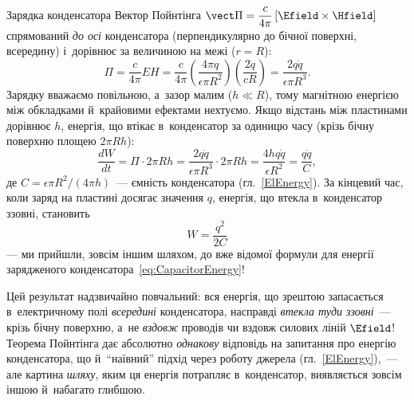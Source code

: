 \begin{Example}{Зарядка конденсатора}
	Вектор Пойнтінга $\vect\Pi=\dfrac{c}{4\pi}\left[\Efield\times\Hfield\right]$
	спрямований \emph{до осі} конденсатора (перпендикулярно до бічної поверхні,
	всередину) і~дорівнює за величиною на межі ($r=R$):
	\begin{equation*}
		\Pi = \frac{c}{4\pi}EH = \frac{c}{4\pi}\left(\frac{4\pi q}{\epsilon\pi R^2}\right)\left(\frac{2\dot q}{cR}\right) = \frac{2q\dot q}{\epsilon\pi R^3}.
	\end{equation*}
	Зарядку вважаємо повільною, а~зазор малим ($h\ll R$), тому магнітною енергією між
	обкладками й~крайовими ефектами нехтуємо. Якщо відстань між пластинами дорівнює $h$,
	енергія, що втікає в~конденсатор за одиницю часу (крізь бічну поверхню площею $2\pi
	Rh$):
	\begin{equation*}
		\frac{dW}{dt} = \Pi\cdot 2\pi Rh = \frac{2q\dot q}{\epsilon\pi R^3}\cdot 2\pi Rh = \frac{4hq\dot q}{\epsilon R^2} = \frac{q\dot q}{C},
	\end{equation*}
	де $C=\epsilon\pi R^2/(4\pi h)$~--- ємність конденсатора (гл.~\ref{ElEnergy}). За
	кінцевий час, коли заряд на пластині досягає значення $q$, енергія, що втекла
	в~конденсатор ззовні, становить
	\begin{equation}\label{eq:CapacitorEnergyResult}
		W = \frac{q^2}{2C}
	\end{equation}
	--- ми прийшли, зовсім іншим шляхом, до вже відомої формули для енергії зарядженого
	конденсатора~\eqref{eq:CapacitorEnergy}!
\end{Example}

\begin{Attention}
	Цей результат надзвичайно повчальний: вся енергія, що зрештою запасається
	в~електричному полі \emph{всередині} конденсатора, насправді \emph{втекла туди
	ззовні}~--- крізь бічну поверхню, а~не \emph{вздовж} проводів чи вздовж силових ліній
	$\Efield$! Теорема Пойнтінга дає абсолютно \emph{однакову} відповідь на запитання про
	енергію конденсатора, що й~\enquote{наївний} підхід через роботу джерела
	(гл.~\ref{ElEnergy}),~--- але картина \emph{шляху}, яким ця енергія потрапляє
	в~конденсатор, виявляється зовсім іншою й~набагато глибшою.
\end{Attention}

